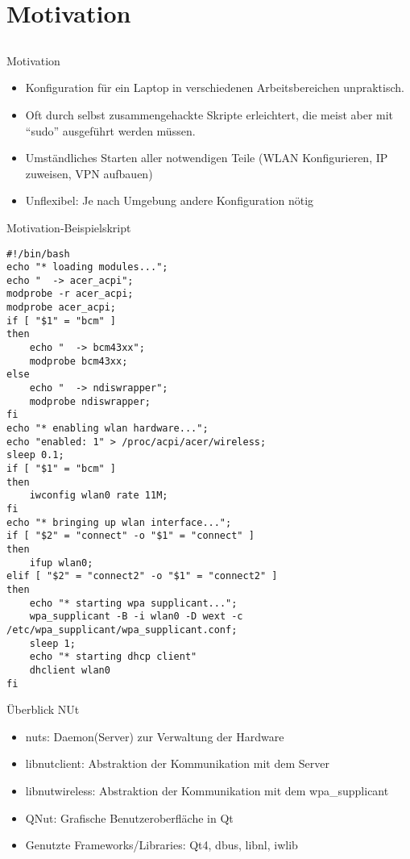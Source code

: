 \section{Motivation}
\subsection{}
\begin{frame}[<+-| alert@+>]{Motivation}
	\begin{itemize}
		\item Konfiguration für ein Laptop in verschiedenen Arbeitsbereichen unpraktisch. \\
		\item Oft durch selbst zusammengehackte Skripte erleichtert, die meist aber mit ``sudo'' ausgeführt werden müssen.
		\item Umständliches Starten aller notwendigen Teile (WLAN Konfigurieren, IP zuweisen, VPN aufbauen)
		\item Unflexibel: Je nach Umgebung andere Konfiguration nötig
	\end{itemize}
\end{frame}

\begin{frame}[fragile]{Motivation-Beispielskript}
\fontsize{4.8}{5.8} \selectfont
\begin{verbatim}
#!/bin/bash
echo "* loading modules...";
echo "  -> acer_acpi";
modprobe -r acer_acpi;
modprobe acer_acpi;
if [ "$1" = "bcm" ]
then
    echo "  -> bcm43xx";
    modprobe bcm43xx;
else
    echo "  -> ndiswrapper";
    modprobe ndiswrapper;
fi
echo "* enabling wlan hardware...";
echo "enabled: 1" > /proc/acpi/acer/wireless;
sleep 0.1;
if [ "$1" = "bcm" ]
then
    iwconfig wlan0 rate 11M;
fi
echo "* bringing up wlan interface...";
if [ "$2" = "connect" -o "$1" = "connect" ]
then
    ifup wlan0;
elif [ "$2" = "connect2" -o "$1" = "connect2" ]
then
    echo "* starting wpa supplicant...";
    wpa_supplicant -B -i wlan0 -D wext -c /etc/wpa_supplicant/wpa_supplicant.conf;
    sleep 1;
    echo "* starting dhcp client"
    dhclient wlan0
fi
\end{verbatim}
\end{frame}

\begin{frame}[<+-| alert@+>]{Überblick NUt}
	\begin{itemize}
		\item nuts: Daemon(Server) zur Verwaltung der Hardware
		\item libnutclient: Abstraktion der Kommunikation mit dem Server
		\item libnutwireless: Abstraktion der Kommunikation mit dem wpa\_supplicant
		\item QNut: Grafische Benutzeroberfläche in Qt
		\item Genutzte Frameworks/Libraries: Qt4, dbus, libnl, iwlib
	\end{itemize}
\end{frame}
